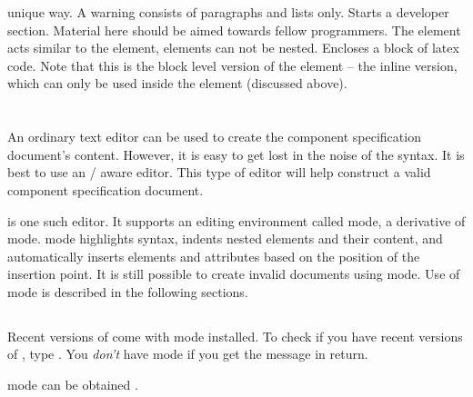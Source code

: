 \documentclass[11pt]{article}
\begin{document}
{\begin{description}
\begin{description}
    unique way.  A warning consists of paragraphs and lists only.
      Starts a developer section.  Material
    here should be aimed towards fellow programmers.  The
     element acts similar to the  element, 
     elements can not be nested.
     Encloses a block of latex code.  Note that this is
    the block level version of the  element -- the inline
    version, which can only be used inside the  element 
    (discussed above).
  \end{description}
\end{description}


\section{\SECediting}
\label{\SECediting}

An ordinary text editor can be used to create the component specification
document's content.  However, it is easy to get lost in the noise of the
\xml{} syntax.  It is best to use an \xml{}/\dtd{} aware editor.
This type of editor will help construct a valid component specification
document.

\Emacs{} is one such editor.  It supports an editing environment called
\xml{} mode, a derivative of \psgml{} mode.  \Xml{} mode
highlights \xml{} syntax, indents nested elements and their content, and
automatically inserts elements and attributes based on the position of the
insertion point.  It is still possible to create invalid documents using
\emacs{} \xml{} mode.
Use of \emacs{} \xml{} mode is described in the following sections.

\subsection{\SUBSECgettingSources}
\label{\SUBSECgettingSources}

Recent versions of \emacs{} come with \xml{} mode installed.  To check
if you have recent versions of \emacs{},  type .  You \emph{don't} have
\xml{} mode if you get the message
\screen{[No match]} in return.

 \xml{} mode can be obtained
.

\subsection{\SUBSECdotEmacs}
\label{\SUBSECdotEmacs}

}
\end{document}
